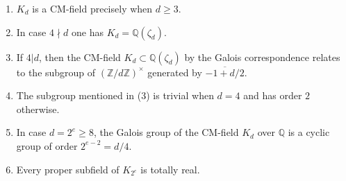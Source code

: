 \documentclass[10pt,a4paper]{amsart}
\newcommand{\QQ}{{\mathbb Q}}
\newcommand{\ZZ}{{\mathbb Z}}
\begin{document}
\begin{lem}\label{fields}
    \begin{enumerate}
        \item $K_d$ is a CM-field precisely when $d\geq 3$.
        \item In case $4\nmid d$ one has $K_d=\QQ(\zeta_d)$.
        \item If $4|d$, then the CM-field $K_d\subset\QQ(\zeta_d)$ by the
        Galois correspondence relates to the subgroup
        of $(\ZZ/d\ZZ)^\times$ generated by
        $\overline{-1+d/2}$.
        \item The subgroup mentioned in (3) is trivial when
        $d=4$ and has order $2$ otherwise.
        \item In case $d=2^e\geq 8$, the Galois group of
        the CM-field $K_d$ over $\QQ$ is a cyclic group of order $2^{e-2}=d/4$.
        \item Every proper subfield of $K_{2^e}$ is totally real.
    \end{enumerate}
\end{lem}
\end{document}
